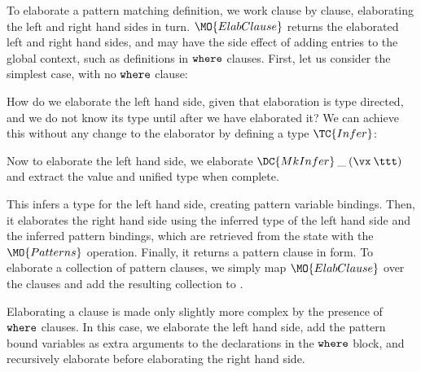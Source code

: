 To elaborate a pattern matching definition, we work clause by clause, elaborating
the left and right hand sides in turn. $\MO{ElabClause}$ returns the elaborated
left and right hand sides, and may have the side effect of adding entries
to the global context, such as definitions in $\mathtt{where}$ clauses.
First, let us consider the simplest case, with no $\mathtt{where}$ clause:


How do we elaborate the left hand side, given that elaboration is type directed, and
we do not know its type until after we have elaborated it? 
We can achieve this without any change to the elaborator by defining 
a type $\TC{Infer}$:


Now to elaborate the left hand side, we elaborate $\DC{MkInfer}\:\_\:(\vx\:\ttt)$ and
extract the value and unified type when complete.


This infers a type for the left hand side, creating pattern variable bindings. Then, 
it elaborates the right hand side using the inferred type of the left hand side
and the inferred pattern bindings, which are retrieved from the state with the
$\MO{Patterns}$ operation. Finally, it returns a pattern clause in \TT{} form.
To elaborate a collection of pattern clauses, we simply map $\MO{ElabClause}$ over
the clauses and add the resulting collection to \TT{}.


Elaborating a clause is made only slightly more complex by the presence of
$\mathtt{where}$ clauses. In this case, we elaborate the left hand side, add the pattern
bound variables as extra arguments to the declarations in the $\mathtt{where}$ block,
and recursively elaborate before elaborating the right hand side.

